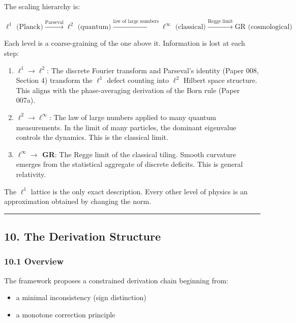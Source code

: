 \documentclass[
]{article}
\providecommand{\tightlist}{%
  \setlength{\itemsep}{0pt}\setlength{\parskip}{0pt}}
\begin{document}
The scaling hierarchy is:

\[\ell^1 \text{ (Planck)} \xrightarrow{\text{Parseval}} \ell^2 \text{ (quantum)} \xrightarrow{\text{law of large numbers}} \ell^\infty \text{ (classical)} \xrightarrow{\text{Regge limit}} \text{GR (cosmological)}\]

Each level is a coarse-graining of the one above it. Information is lost
at each step:

\begin{enumerate}
\def\labelenumi{\arabic{enumi}.}
\item
  \textbf{\(\ell^1 \to \ell^2\)}: The discrete Fourier transform and
  Parseval's identity (Paper 008, Section 4) transform the \(\ell^1\)
  defect counting into \(\ell^2\) Hilbert space structure. This aligns
  with the phase-averaging derivation of the Born rule (Paper 007a).
\item
  \textbf{\(\ell^2 \to \ell^\infty\)}: The law of large numbers applied
  to many quantum measurements. In the limit of many particles, the
  dominant eigenvalue controls the dynamics. This is the classical
  limit.
\item
  \textbf{\(\ell^\infty \to\) GR}: The Regge limit of the classical
  tiling. Smooth curvature emerges from the statistical aggregate of
  discrete deficits. This is general relativity.
\end{enumerate}

The \(\ell^1\) lattice is the only exact description. Every other level
of physics is an approximation obtained by changing the norm.

\begin{center}\rule{0.5\linewidth}{0.5pt}\end{center}

\subsection{10. The Derivation
Structure}\label{the-derivation-structure}

\subsubsection{10.1 Overview}\label{overview}

The framework proposes a constrained derivation chain beginning from:

\begin{itemize}
\tightlist
\item
  a minimal inconsistency (sign distinction)
\item
  a monotone correction principle
\end{itemize}
\end{document}
